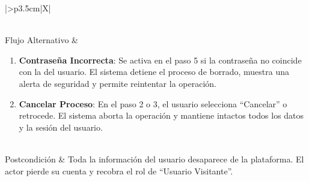 \begin{xltabular}{\textwidth}{|>{\bfseries}p{3.5cm}|X|}
\begin{enumerate}[leftmargin=0.5cm, topsep=0pt, partopsep=0pt, parsep=0pt, itemsep=4pt]
    \end{enumerate} 
    \\ \hline
    Flujo Alternativo & 
    \begin{enumerate}[leftmargin=0.5cm, topsep=0pt, partopsep=0pt, parsep=0pt, itemsep=4pt]
        \item \textbf{Contraseña Incorrecta}: Se activa en el paso 5 si la contraseña no coincide con la del usuario. El sistema detiene el proceso de borrado, muestra una alerta de seguridad y permite reintentar la operación.
        \item \textbf{Cancelar Proceso}: En el paso 2 o 3, el usuario selecciona ``Cancelar'' o retrocede. El sistema aborta la operación y mantiene intactos todos los datos y la sesión del usuario.
    \end{enumerate}
    \\ \hline
    Postcondición & Toda la información del usuario desaparece de la plataforma. El actor pierde su cuenta y recobra el rol de ``Usuario Visitante''. \\ \hline

    \caption{CU5: Eliminar Cuenta}
    \label{tab:esp_cu5} \\
    
\end{xltabular}
\endgroup

